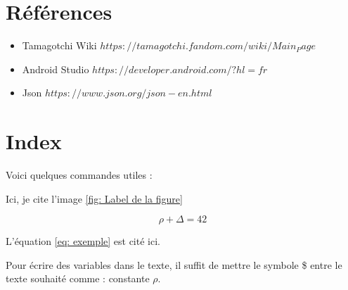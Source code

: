 \documentclass{rapportECL}
\begin{document}
\section{Références}
\begin{itemize}[label=\textbullet]
\item Tamagotchi Wiki \href{https://tamagotchi.fandom.com/wiki/Main_Page}{$https://tamagotchi.fandom.com/wiki/Main_Page$}
\item Android Studio \href{https://developer.android.com/?hl=fr}{$https://developer.android.com/?hl=fr$}
\item Json \href{https://www.json.org/json-en.html}{$https://www.json.org/json-en.html$}
\end{itemize}

\section{Index}


Voici quelques commandes utiles :



Ici, je cite l'image \ref{fig: Label de la figure}



\begin{equation} \label{eq: exemple}
\rho + \Delta = 42
\end{equation}

L'équation \ref{eq: exemple} est cité ici. 


Pour écrire des variables dans le texte, il suffit de mettre le symbole \$ entre le texte souhaité comme : constante $\rho$. 
\end{document}
